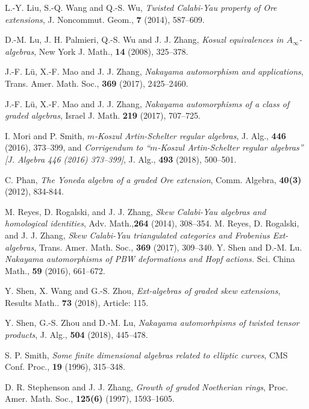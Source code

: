 \documentclass[a4paper,10pt]{amsart}
\theoremstyle{definition}
\numberwithin{equation}{section}
\begin{document}
\begin{thebibliography}{10}
L.-Y. Liu, S.-Q. Wang and Q.-S. Wu, \emph{Twisted Calabi-Yau property of Ore extensions}, J. Noncommut. Geom., \textbf{7} (2014), 587--609.


D.-M. Lu, J. H. Palmieri, Q.-S. Wu and J. J. Zhang, \emph{Kosuzl equivalences in $A_\infty$-algebras}, New York J. Math., \textbf{14} (2008), 325--378.


J.-F. L\"u, X.-F. Mao and J. J. Zhang, \emph{Nakayama automorphism and applications}, Trans. Amer. Math. Soc., \textbf{369} (2017), 2425--2460.

J.-F. L\"u, X.-F. Mao and J. J. Zhang, \emph{Nakayama automorphisms of a class of graded algebras},
Israel J. Math. \textbf{219} (2017), 707--725.

I. Mori and P. Smith, \emph{$m$-Koszul Artin-Schelter regular algebras},  J. Alg., \textbf{446} (2016), 373--399, and \emph{Corrigendum to ``$m$-Koszul Artin-Schelter regular algebras'' [J. Algebra 446 (2016) 373–399]}, J. Alg., \textbf{493} (2018), 500--501.


C. Phan, \emph{The Yoneda algebra of a graded Ore extension}, Comm. Algebra, \textbf{40(3)} (2012), 834-844.

M. Reyes, D. Rogalski, and J. J. Zhang, \emph{Skew Calabi-Yau algebras and homological identities}, Adv. Math.,\textbf{264} (2014), 308--354.
%
M. Reyes, D. Rogalski, and J. J. Zhang, \emph{Skew Calabi-Yau triangulated categories and Frobenius Ext-algebras}, Trans. Amer. Math. Soc., \textbf{369} (2017), 309--340.
Y. Shen and D.-M. Lu. \emph{Nakayama automorphisms of PBW deformations and Hopf actions.}
Sci. China Math., \textbf{59} (2016), 661--672.

Y. Shen, X. Wang and G.-S. Zhou, \emph{Ext-algebras of graded skew extensions}, Results Math.. \textbf{73} (2018), Article: 115.

Y. Shen, G.-S. Zhou and D.-M. Lu, \emph{Nakayama automorhpisms of twisted tensor products}, J. Alg., \textbf{504} (2018), 445--478.

S. P. Smith, \emph{Some finite dimensional algebras related to elliptic curves}, CMS Conf. Proc., \textbf{19} (1996), 315--348.

D. R. Stephenson and J. J. Zhang, \emph{Growth of graded Noetherian rings}, Proc. Amer. Math. Soc., \textbf{125(6)} (1997), 1593--1605.





\end{thebibliography}
\end{document}
